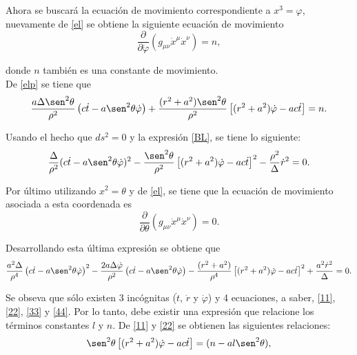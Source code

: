  Ahora se buscar\'a la ecuaci\'on de movimiento correspondiente a $x^3=\varphi$, nuevamente de \eqref{el} se obtiene la siguiente ecuaci\'on de movimiento
 \begin{equation}\label{elp}
 \frac{\partial}{\partial \dot{\varphi}}\left(g_{\mu \nu}\dot{x}^{\mu}\dot{x}^{\nu}\right)=n,
 \end{equation}
 
donde $n$ tambi\'en es una constante de movimiento.\\

De \eqref{elp} se tiene que
\begin{equation}\label{22}
\frac{a\Delta \sen^2 \theta}{\rho^2}\left(c\dot{t}-a\sen^2 \theta \dot{\varphi}\right)+\frac{(r^2+a^2)\sen^2 \theta}{\rho^2}\left[(r^2+a^2)\dot{\varphi}-ac\dot{t} \right]=n.
\end{equation}
 
Usando el hecho que $ds^2=0$ y la expresi\'on \eqref{BL}, se tiene lo siguiente:
\begin{equation}\label{33}
\frac{\Delta}{\rho^2}(c\dot{t}-a\sen^2\theta \dot{\varphi})^2-\frac{\sen^2\theta}{\rho^2}\left[(r^2+a^2)\dot{\varphi}-ac\dot{t} \right]^2-\frac{\rho^2}{\Delta}\dot{r}^2=0.
\end{equation} 
 
Por \'ultimo utilizando $x^2=\theta$ y de \eqref{el}, se tiene que la ecuaci\'on de movimiento asociada a esta coordenada es
\begin{equation}
\frac{\partial }{\partial \theta}\left(g_{\mu \nu}\dot{x}^{\mu}\dot{x}^{\nu} \right)=0.
\end{equation} 

Desarrollando esta \'ultima expresi\'on se obtiene que
\begin{equation}\label{44}
\frac{a^2\Delta}{\rho^4}\left(c\dot{t}-a\sen^2 \theta \dot{\varphi} \right)^2-\frac{2a\Delta \dot{\varphi}}{\rho^2}\left(c\dot{t}-a\sen^2 \theta \dot{\varphi} \right)-\frac{(r^2+a^2)}{\rho^4}\left[(r^2+a^2)\dot{\varphi}-ac\dot{t} \right]^2+\frac{a^2\dot{r}^2}{\Delta}=0.
\end{equation}
 
Se obseva que s\'olo existen 3 inc\'ognitas ($\dot{t}$, $\dot{r}$ y $\dot{\varphi}$) y 4 ecuaciones, a saber, \eqref{11}, \eqref{22}, \eqref{33} y \eqref{44}. Por lo tanto, debe existir una expresi\'on que relacione los t\'erminos constantes $l$ y $n$. De \eqref{11} y \eqref{22} se obtienen las siguientes relaciones:
\begin{equation}\label{55}
\sen^2\theta \left[(r^2+a^2)\dot{\varphi}-ac\dot{t} \right]=(n-al\sen^2\theta),
\end{equation}
 

